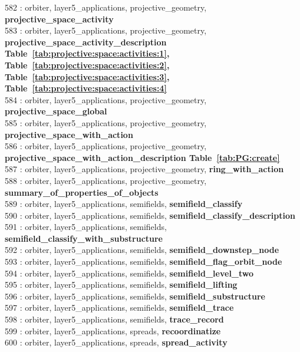 582 : orbiter, layer5\_applications, projective\_geometry, {\bf projective\_space\_activity}\\
583 : orbiter, layer5\_applications, projective\_geometry, {\bf projective\_space\_activity\_description Table~\ref{tab:projective:space:activities:1},  Table~\ref{tab:projective:space:activities:2},  Table~\ref{tab:projective:space:activities:3},  Table~\ref{tab:projective:space:activities:4}}\\
584 : orbiter, layer5\_applications, projective\_geometry, {\bf projective\_space\_global}\\
585 : orbiter, layer5\_applications, projective\_geometry, {\bf projective\_space\_with\_action}\\
586 : orbiter, layer5\_applications, projective\_geometry, {\bf projective\_space\_with\_action\_description Table~\ref{tab:PG:create}}\\
587 : orbiter, layer5\_applications, projective\_geometry, {\bf ring\_with\_action}\\
588 : orbiter, layer5\_applications, projective\_geometry, {\bf summary\_of\_properties\_of\_objects}\\
589 : orbiter, layer5\_applications, semifields, {\bf semifield\_classify}\\
590 : orbiter, layer5\_applications, semifields, {\bf semifield\_classify\_description}\\
591 : orbiter, layer5\_applications, semifields, {\bf semifield\_classify\_with\_substructure}\\
592 : orbiter, layer5\_applications, semifields, {\bf semifield\_downstep\_node}\\
593 : orbiter, layer5\_applications, semifields, {\bf semifield\_flag\_orbit\_node}\\
594 : orbiter, layer5\_applications, semifields, {\bf semifield\_level\_two}\\
595 : orbiter, layer5\_applications, semifields, {\bf semifield\_lifting}\\
596 : orbiter, layer5\_applications, semifields, {\bf semifield\_substructure}\\
597 : orbiter, layer5\_applications, semifields, {\bf semifield\_trace}\\
598 : orbiter, layer5\_applications, semifields, {\bf trace\_record}\\
599 : orbiter, layer5\_applications, spreads, {\bf recoordinatize}\\
600 : orbiter, layer5\_applications, spreads, {\bf spread\_activity}\\
